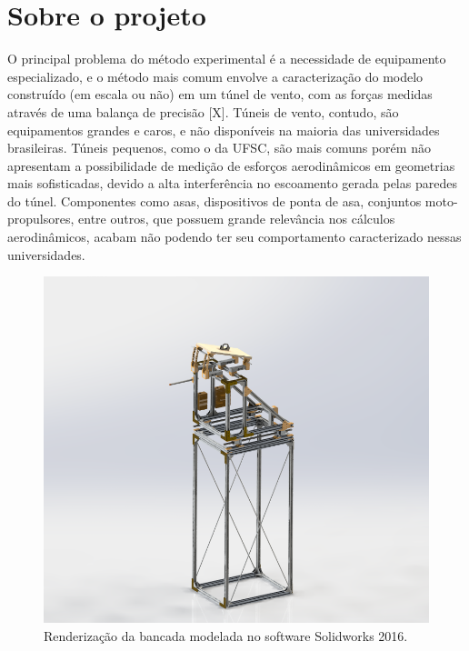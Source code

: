 \section{Sobre o projeto}

O principal problema do método experimental é a necessidade de equipamento especializado, e o método mais comum envolve a caracterização do modelo construído (em escala ou não) em um túnel de vento, com as forças medidas através de uma balança de precisão [X]. Túneis de vento, contudo, são equipamentos grandes e caros, e não disponíveis na maioria das universidades brasileiras. Túneis pequenos, como o da UFSC, são mais comuns porém não apresentam a possibilidade de medição de esforços aerodinâmicos em geometrias mais sofisticadas, devido a alta interferência no escoamento gerada pelas paredes do túnel. Componentes como asas, dispositivos de ponta de asa, conjuntos moto-propulsores, entre outros, que possuem grande relevância nos cálculos aerodinâmicos, acabam não podendo ter seu comportamento caracterizado nessas universidades.

\begin{figure}[!ht]
    \centering
    \includegraphics[width=.8\linewidth]{figuras/renders/perspectiva_sem_asa_com_pitot.png}
    \caption{Renderização da bancada modelada no software Solidworks 2016\cite{autor}.}
    \label{fig:render_bancada_completa}
\end{figure}

